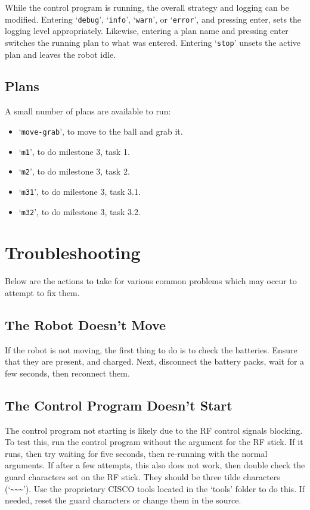 \documentclass[a4paper]{scrartcl}
\begin{document}
While the control program is running, the overall strategy and logging can be
modified. Entering `\texttt{debug}', `\texttt{info}', `\texttt{warn}', or
`\texttt{error}', and pressing enter, sets the logging level appropriately.
Likewise, entering a plan name and pressing enter switches the running plan to
what was entered. Entering `\texttt{stop}' unsets the active plan and leaves
the robot idle.

\pagebreak

\subsection{Plans}

A small number of plans are available to run:

\begin{itemize}
    \item `\texttt{move-grab}', to move to the ball and grab it.
    \item `\texttt{m1}', to do milestone 3, task 1.
    \item `\texttt{m2}', to do milestone 3, task 2.
    \item `\texttt{m31}', to do milestone 3, task 3.1.
    \item `\texttt{m32}', to do milestone 3, task 3.2.
\end{itemize}

%

\section{Troubleshooting}

Below are the actions to take for various common problems which may occur to
attempt to fix them.

\subsection{The Robot Doesn't Move}

If the robot is not moving, the first thing to do is to check the batteries.
Ensure that they are present, and charged. Next, disconnect the battery packs,
wait for a few seconds, then reconnect them.

\subsection{The Control Program Doesn't Start}

The control program not starting is likely due to the RF control signals
blocking. To test this, run the control program without the argument for the RF
stick. If it runs, then try waiting for five seconds, then re-running with the
normal arguments. If after a few attempts, this also does not work, then double
check the guard characters set on the RF stick. They should be three tilde
characters (`\verb$~~~$'). Use the proprietary CISCO tools located in the
`tools' folder to do this. If needed, reset the guard characters or change them
in the source.
\end{document}
